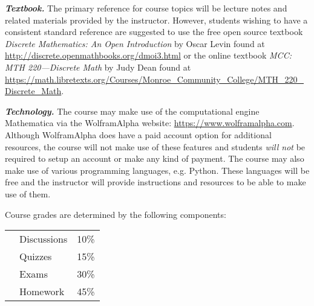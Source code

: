 \documentclass[11pt,letterpaper]{article}
\begin{document}
{\itshape\bfseries\color{stacred}Textbook.} The primary reference for course topics will be lecture notes and related materials provided by the instructor. However, students wishing to have a consistent standard reference are suggested to use the free open source textbook \textit{Discrete Mathematics: An Open Introduction} by Oscar Levin found at \url{http://discrete.openmathbooks.org/dmoi3.html} or the online textbook \textit{MCC: MTH 220---Discrete Math} by Judy Dean found at \url{https://math.libretexts.org/Courses/Monroe_Community_College/MTH_220_Discrete_Math}. \pspace

{\itshape\bfseries\color{stacred}Technology.} The course may make use of the computational engine Mathematica via the WolframAlpha website: \url{https://www.wolframalpha.com}. Although WolframAlpha does have a paid account option for additional resources, the course will not make use of these features and students {\itshape will not} be required to setup an account or make any kind of payment. The course may also make use of various programming languages, e.g. Python. These languages will be free and the instructor will provide instructions and resources to be able to make use of them. \sectionbreak











Course grades are determined by the following components: \par
	\begin{table}[!ht]
        \begin{tabular}{clr}
        & Discussions & 10\% \\
	& Quizzes & 15\% \\
	& Exams & 30\% \\
	& Homework & 45\% \\
        \end{tabular} 
        \end{table}
\pspace
\end{document}
